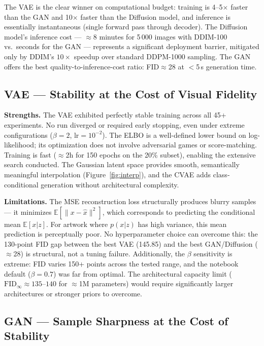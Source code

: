 \documentclass[runningheads]{llncs}
\begin{document}
The VAE is the clear winner on computational budget: training is 4--5$\times$
faster than the GAN and 10$\times$ faster than the Diffusion model, and
inference is essentially instantaneous (single forward pass through decoder).
The Diffusion model's inference cost --- $\approx$8 minutes for 5\,000 images
with DDIM-100 vs.\ seconds for the GAN --- represents a significant deployment
barrier, mitigated only by DDIM's $10{\times}$ speedup over standard DDPM-1000
sampling. The GAN offers the best quality-to-inference-cost ratio: FID$\approx$28
at $<$5\,s generation time.

\subsection{VAE — Stability at the Cost of Visual Fidelity}

\textbf{Strengths.} The VAE exhibited perfectly stable training across all 45+ experiments. No run diverged or required early stopping, even under extreme configurations ($\beta=2$, lr$=10^{-2}$). The ELBO is a well-defined lower bound on log-likelihood; its optimization does not involve adversarial games or score-matching. Training is fast ($\approx$2h for 150 epochs on the 20\% subset), enabling the extensive search conducted. The Gaussian latent space provides smooth, semantically meaningful interpolation (Figure~\ref{fig:interp}), and the CVAE adds class-conditional generation without architectural complexity.

\textbf{Limitations.} The MSE reconstruction loss structurally produces blurry samples — it minimizes $\mathbb{E}[\|x-\hat{x}\|^2]$, which corresponds to predicting the conditional mean $\mathbb{E}[x|z]$. For artwork where $p(x|z)$ has high variance, this mean prediction is perceptually poor. No hyperparameter choice can overcome this: the 130-point FID gap between the best VAE (145.85) and the best GAN/Diffusion ($\approx$28) is structural, not a tuning failure. Additionally, the $\beta$ sensitivity is extreme: FID varies 150+ points across the tested range, and the notebook default ($\beta=0.7$) was far from optimal. The architectural capacity limit ($\mathrm{FID}_\infty \approx 135$--$140$ for $\approx$1M parameters) would require significantly larger architectures or stronger priors to overcome.

\subsection{GAN — Sample Sharpness at the Cost of Stability}
\end{document}
